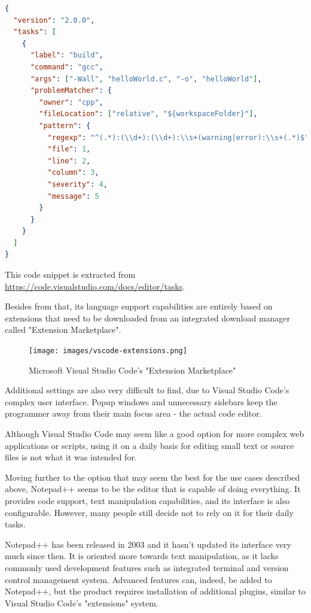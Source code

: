 \begin{lstlisting}[language=json, caption={tasks.json configuration for compiling C sources in Visual Studio Code}]
{
  "version": "2.0.0",
  "tasks": [
    {
      "label": "build",
      "command": "gcc",
      "args": ["-Wall", "helloWorld.c", "-o", "helloWorld"],
      "problemMatcher": {
        "owner": "cpp",
        "fileLocation": ["relative", "${workspaceFolder}"],
        "pattern": {
          "regexp": "^(.*):(\\d+):(\\d+):\\s+(warning|error):\\s+(.*)$",
          "file": 1,
          "line": 2,
          "column": 3,
          "severity": 4,
          "message": 5
        }
      }
    }
  ]
}
\end{lstlisting}

This code snippet is extracted from \href{https://code.visualstudio.com/docs/editor/tasks}{https://code.visualstudio.com/docs/editor/tasks}.

\hspace{0pt}

Besides from that, its language support capabilities are entirely based on extensions that need to be downloaded from an integrated download manager called "Extension Marketplace".

\begin{figure}[H]
\centering
\texttt{[image: images/vscode-extensions.png]}
\caption{Microsoft Visual Studio Code's "Extension Marketplace"}
\label{fig:fig2,1.}
\end{figure}

Additional settings are also very difficult to find, due to Visual Studio Code's complex user interface. Popup windows and unnecessary sidebars keep the programmer away from their main focus area - the actual code editor.

Although Visual Studio Code may seem like a good option for more complex web applications or scripts, using it on a daily basis for editing small text or source files is not what it was intended for.

Moving further to the option that may seem the best for the use cases described above, Notepad++ seems to be the editor that is capable of doing everything. It provides code support, text manipulation capabilities, and its interface is also configurable. However, many people still decide not to rely on it for their daily tasks.

Notepad++ has been released in 2003 and it hasn't updated its interface very much since then. It is oriented more towards text manipulation, as it lacks commonly used development features such as integrated terminal and version control management system. Advanced features can, indeed, be added to Notepad++, but the product requires installation of additional plugins, similar to Visual Studio Code's "extensions" system.

